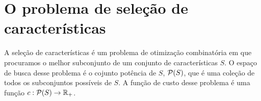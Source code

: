 %

\section{O problema de seleção de características}
A seleção de características é um problema de otimização combinatória 
em que procuramos o melhor subconjunto de um conjunto de características
$S$. O espaço de busca desse problema é o cojunto potência de $S$, 
$\mathcal{P} (S)$, que é uma coleção de todos os subconjuntos possíveis de
 $S$. A função de custo desse problema é uma função $c : \mathcal{P} (S) 
\to \mathbb{R}_{+}$.


